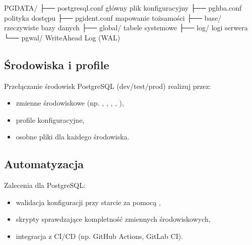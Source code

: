 \documentclass[letterpaper,10pt,english]{sphinxmanual}
\begin{document}
\begin{sphinxVerbatim}[commandchars=\\\{\}]
\PYGZdl{}PGDATA/
├── postgresql.conf   \PYGZsh{} główny plik konfiguracyjny
├── pg\PYGZus{}hba.conf       \PYGZsh{} polityka dostępu
├── pg\PYGZus{}ident.conf     \PYGZsh{} mapowanie tożsamości
├── base/             \PYGZsh{} rzeczywiste bazy danych
├── global/           \PYGZsh{} tabele systemowe
├── log/              \PYGZsh{} logi serwera
└── pg\PYGZus{}wal/           \PYGZsh{} Write\PYGZhy{}Ahead Log (WAL)
\end{sphinxVerbatim}

\sphinxAtStartPar
{}

\begin{sphinxVerbatim}[commandchars=\\\{\}]
\end{sphinxVerbatim}


\subsection{Środowiska i profile}
\label{\detokenize{rozdzial_2/rozdzial_22/index:srodowiska-i-profile}}
\sphinxAtStartPar
Przełączanie środowisk PostgreSQL (dev/test/prod) realizuj przez:
\begin{itemize}
\item {} 
\sphinxAtStartPar
zmienne środowiskowe (np. , , , , ),

\item {} 
\sphinxAtStartPar
profile konfiguracyjne,

\item {} 
\sphinxAtStartPar
osobne pliki  dla każdego środowiska.

\end{itemize}


\subsection{Automatyzacja}
\label{\detokenize{rozdzial_2/rozdzial_22/index:automatyzacja}}
\sphinxAtStartPar
Zalecenia dla PostgreSQL:
\begin{itemize}
\item {} 
\sphinxAtStartPar
walidacja konfiguracji przy starcie za pomocą ,

\item {} 
\sphinxAtStartPar
skrypty sprawdzające kompletność zmiennych środowiskowych,

\item {} 
\sphinxAtStartPar
integracja z CI/CD (np. GitHub Actions, GitLab CI).

\end{itemize}
\end{document}
